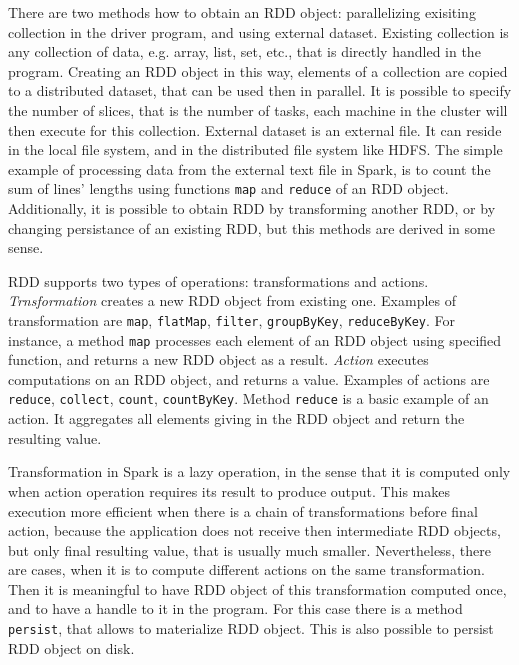 There are two methods how to obtain an RDD object: parallelizing exisiting collection in the driver program, and using external dataset.
Existing collection is any collection of data, e.g. array, list, set, etc., that is directly handled in the program.
Creating an RDD object in this way, elements of a collection are copied to a distributed dataset, that can be used then in parallel.
It is possible to specify the number of slices, that is the number of tasks, each machine in the cluster will then execute for this collection.
External dataset is an external file.
It can reside in the local file system, and in the distributed file system like HDFS.
The simple example of processing data from the external text file in Spark, is to count the sum of lines' lengths using functions \lstinline{map} and \lstinline{reduce} of an RDD object. 
Additionally, it is possible to obtain RDD by transforming another RDD, or by changing persistance of an existing RDD, but this methods are derived in some sense.

RDD supports two types of operations: transformations and actions.
\textit{Trnsformation}  creates a new RDD object from existing one.
Examples of transformation are \lstinline{map}, \lstinline{flatMap}, \lstinline{filter}, \lstinline{groupByKey}, \lstinline{reduceByKey}.
For instance, a method \lstinline{map} processes each element of an RDD object using specified function, and returns a new RDD object as a result.
\textit{Action}  executes computations on an RDD object, and returns a value.
Examples of actions are \lstinline{reduce}, \lstinline{collect}, \lstinline{count}, \lstinline{countByKey}.
Method \lstinline{reduce} is a basic example of an action.
It aggregates all elements giving in the RDD object and return the resulting value.

Transformation in Spark is a lazy operation, in the sense that it is computed only when action operation requires its result to produce output.
This makes execution more efficient when there is a chain of transformations before final action, because the application does not receive then intermediate RDD objects, but only final resulting value, that is usually much smaller.
Nevertheless, there are cases, when it is to compute different actions on the same transformation.
Then it is meaningful to have RDD object of this transformation computed once, and to have a handle to it in the program.
For this case there is a method \lstinline{persist}, that allows to materialize RDD object.
This is also possible to persist RDD object on disk.

